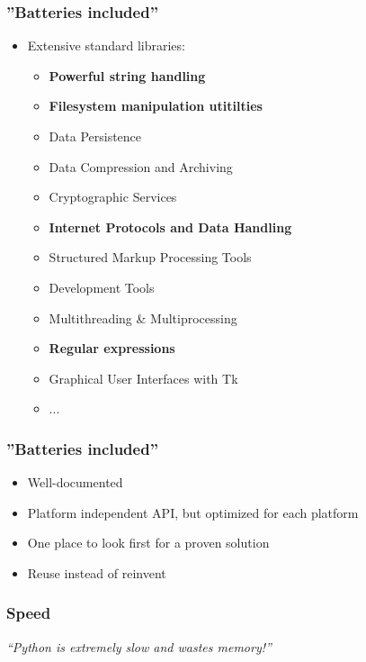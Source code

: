 \documentclass[handout]{beamer}
\begin{document}
\begin{frame}
    \frametitle{''Batteries included''}
    \begin{itemize}
        \item Extensive standard libraries:
        \begin{itemize}
            \item \textbf{Powerful string handling}
            \item \textbf{Filesystem manipulation utitilties}
            \item Data Persistence
            \item Data Compression and Archiving
            \item Cryptographic Services
            \item \textbf{Internet Protocols and Data Handling}
            \item Structured Markup Processing Tools
            \item Development Tools
            \item Multithreading \& Multiprocessing
            \item \textbf{Regular expressions}
            \item Graphical User Interfaces with Tk
            \item ...
        \end{itemize}
    \end{itemize}
\end{frame}

\begin{frame}
    \frametitle{''Batteries included''}
    \begin{itemize}
        \item Well-documented
        \item Platform independent API, but optimized for each platform
        \item One place to look first for a proven solution
        \item Reuse instead of reinvent
    \end{itemize}
\end{frame}

\begin{frame}
    \frametitle{Speed}
    \begin{center}
    \Large{\textit{``Python is extremely slow and wastes memory!''}}
    \normalsize
    \end{center}
\end{frame}
\end{document}
